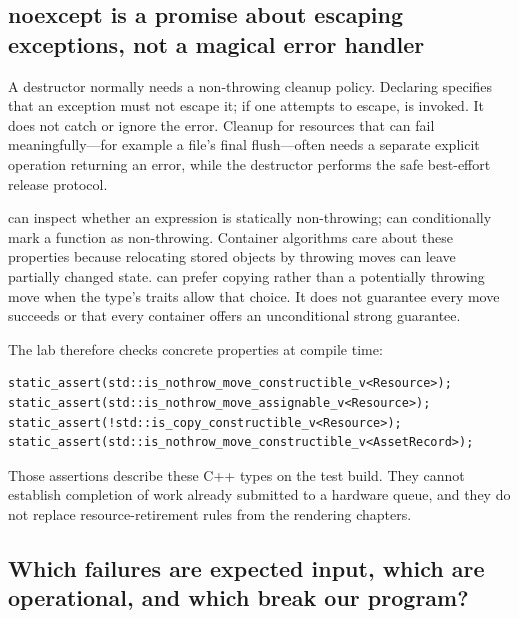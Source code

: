 \subsection{noexcept is a promise about escaping exceptions, not a magical error handler}\label{01-foundations-i-ch004-noexcept-is-a-promise-about-escaping-exceptions-not-a-magical-error-handler}

\hypertarget{01-foundations-i-ch004-noexcept-is-a-promise-about-escaping-exceptions-not-a-magical-error-handler}{}

A destructor normally needs a non-throwing cleanup policy. Declaring  specifies that an exception must not escape it; if one attempts to escape,  is invoked. It does not catch or ignore the error. Cleanup for resources that can fail meaningfully---for example a file's final flush---often needs a separate explicit operation returning an error, while the destructor performs the safe best-effort release protocol.

 can inspect whether an expression is statically non-throwing;  can conditionally mark a function as non-throwing. Container algorithms care about these properties because relocating stored objects by throwing moves can leave partially changed state.  can prefer copying rather than a potentially throwing move when the type's traits allow that choice. It does not guarantee every move succeeds or that every container offers an unconditional strong guarantee.

The lab therefore checks concrete properties at compile time:

\begin{verbatim}
static_assert(std::is_nothrow_move_constructible_v<Resource>);
static_assert(std::is_nothrow_move_assignable_v<Resource>);
static_assert(!std::is_copy_constructible_v<Resource>);
static_assert(std::is_nothrow_move_constructible_v<AssetRecord>);
\end{verbatim}

Those assertions describe these C++ types on the test build. They cannot establish completion of work already submitted to a hardware queue, and they do not replace resource-retirement rules from the rendering chapters.

\subsection{Which failures are expected input, which are operational, and which break our program?}\label{01-foundations-i-ch004-which-failures-are-expected-input-which-are-operational-and-which-break-our-program}

